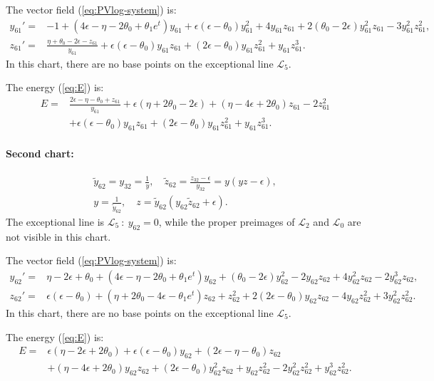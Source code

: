 The vector field  (\ref{eq:PVlog-system}) is:
$$
\begin{aligned}
y_{61}'=&
-1 + (4 \epsilon - \eta  - 2 \theta_0  + \theta_1 e^t) y_{61} 
+\epsilon( \epsilon -  \theta_0) y_{61}^2 + 4 y_{61} z_{61} +2(\theta_0- 2\epsilon) y_{61}^2 z_{61}-  3 y_{61}^2 z_{61}^2
,
\\
z_{61}'=&
\frac{\eta+\theta_0-2\epsilon-z_{61}}{y_{61}}
 + \epsilon (\epsilon-\theta_0)y_{61} z_{61} + (2 \epsilon - \theta_0) y_{61} z_{61}^2 + y_{61} z_{61}^3
.
\end{aligned}
$$
In this chart, there are no base points on the exceptional line $\mathcal{L}_5$.

The energy (\ref{eq:E}) is:
$$
\begin{aligned}
E=& 
\frac{2 \epsilon-\eta-\theta_0+z_{61}}{y_{61}}
+\epsilon(\eta+2\theta_0-2\epsilon)
+(\eta-4 \epsilon+2 \theta_0) z_{61}
-2 z_{61}^2
\\
&
+\epsilon(\epsilon-\theta_0) y_{61} z_{61}
+(2 \epsilon-\theta_0)y_{61} z_{61}^2
+y_{61} z_{61}^3
.
\end{aligned}
$$

\paragraph{Second chart:}
\begin{gather*}
\tilde{y}_{62}=y_{32}=\frac{1}{y},
\quad
\tilde{z}_{62}=\frac{z_{32}-\epsilon}{y_{32}}=y(yz-\epsilon),
\\
y=\frac{1}{\tilde{y}_{62}},
\quad
z=\tilde{y}_{62}(y_{62}\tilde{z}_{62}+\epsilon).
\end{gather*}
The exceptional line is $\mathcal{L}_5\ :\ y_{62}=0$, while the proper preimages of $\mathcal{L}_2$ and $\mathcal{L}_0$ are not visible in this chart.

The vector field  (\ref{eq:PVlog-system}) is:
$$
\begin{aligned}
y_{62}'=&
\eta-2 \epsilon+\theta_0
+(4 \epsilon-\eta-2 \theta_0+\theta_1 e^t ) y_{62}
+(\theta_0-2 \epsilon) y_{62}^2
-2 y_{62} z_{62}
+4 y_{62}^2 z_{62}
-2 y_{62}^3 z_{62}
,\\
z_{62}'=&
\epsilon(\epsilon- \theta_0)
+(\eta +2 \theta_0 -4 \epsilon -\theta_1 e^t )z_{62}
+z_{62}^2
+2(2 \epsilon -\theta_0) y_{62} z_{62}
-4 y_{62} z_{62}^2
+3 y_{62}^2 z_{62}^2
.
\end{aligned}
$$
In this chart, there are no base points on the exceptional line $\mathcal{L}_5$.

The energy (\ref{eq:E}) is:
$$
\begin{aligned}
E=&
\epsilon(\eta-2\epsilon+2  \theta_0)
+\epsilon(\epsilon- \theta_0) y_{62}
+(2 \epsilon-\eta -\theta_0 ) z_{62}
\\&
+(\eta -4 \epsilon+2 \theta_0 ) y_{62} z_{62}
+(2 \epsilon -\theta_0) y_{62}^2 z_{62}
+y_{62} z_{62}^2
-2 y_{62}^2 z_{62}^2
+y_{62}^3 z_{62}^2
.
\end{aligned}
$$

